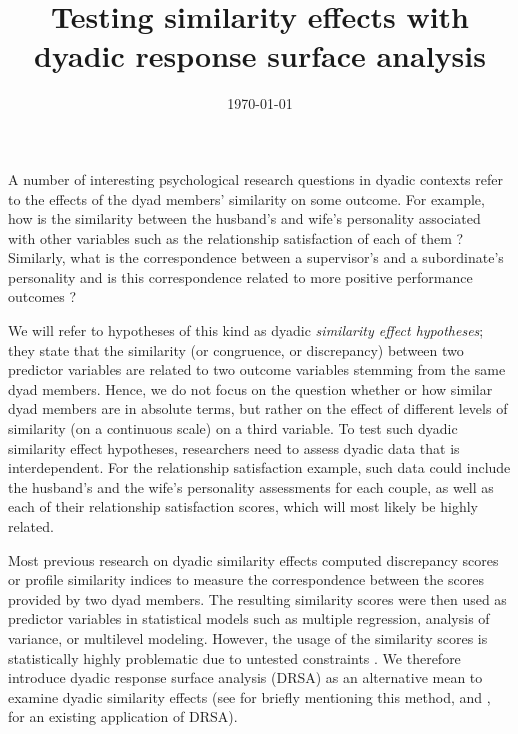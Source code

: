 \documentclass[jou,a4paper,draftfirst]{apa6}
\title{Testing similarity effects with dyadic response surface analysis}
\date{\today}
\begin{document}
\maketitle	%
A number of interesting psychological research questions in dyadic contexts refer to the effects of the dyad members’ similarity on some outcome. For example, how is the similarity between the husband's and wife’s personality associated with other variables such as the relationship satisfaction of each of them \parencite[e.g.,][]{DyrenforthEtAl2010}? Similarly, what is the correspondence between a supervisor’s and a subordinate’s personality and is this correspondence related to more positive performance outcomes \parencite[e.g.,][]{Strauss2001}? 

We will refer to hypotheses of this kind as dyadic \textit{similarity effect hypotheses}; they state that the similarity (or congruence, or discrepancy) between two predictor variables are related to two outcome variables stemming from the same dyad members. Hence, we do not focus on the question whether or how similar dyad members are in absolute terms, but rather on the effect of different levels of similarity (on a continuous scale) on a third variable. To test such dyadic similarity effect hypotheses, researchers need to assess dyadic data that is interdependent. For the relationship satisfaction example, such data could include the husband's and the wife's personality assessments for each couple, as well as each of their relationship satisfaction scores, which will most likely be highly related.

Most previous research on dyadic similarity effects computed discrepancy scores or profile similarity indices to measure the correspondence between the scores provided by two dyad members. The resulting similarity scores were then used as predictor variables in statistical models such as multiple regression, analysis of variance, or multilevel modeling. However, the usage of the similarity scores is statistically highly problematic due to untested constraints \parencite[e.g.,][]{Edwards2001}. We therefore introduce dyadic response surface analysis (DRSA) as an alternative mean to examine dyadic similarity effects (see  for briefly mentioning this method, and , for an existing application of DRSA).
\end{document}
